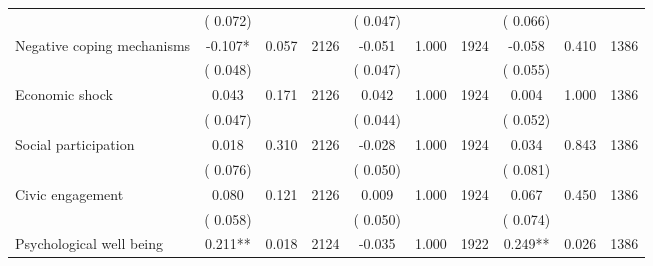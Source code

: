 \begin{tabular}{l*{9}{c}}
                               &        (       0.072) & &                                                                 &       (       0.047) & &                                                          &       (       0.066) & &  \\ 
 Negative coping mechanisms                 &             -0.107*          &        0.057 & 2126          &             -0.051 &        1.000 & 1924                   &       -0.058 &        0.410 & 1386                 \\ 
                               &        (       0.048) & &                                                                 &       (       0.047) & &                                                          &       (       0.055) & &  \\ 
 Economic shock                 &              0.043          &        0.171 & 2126          &              0.042 &        1.000 & 1924                   &        0.004 &        1.000 & 1386                 \\ 
                               &        (       0.047) & &                                                                 &       (       0.044) & &                                                          &       (       0.052) & &   \\ 
 Social participation                 &              0.018          &        0.310 & 2126          &             -0.028 &        1.000 & 1924                   &        0.034 &        0.843 & 1386                 \\ 
                               &        (       0.076) & &                                                                 &       (       0.050) & &                                                          &       (       0.081) & &   \\ 
 Civic engagement                 &              0.080          &        0.121 & 2126          &              0.009 &        1.000 & 1924                   &        0.067 &        0.450 & 1386                 \\ 
                               &        (       0.058) & &                                                                 &       (       0.050) & &                                                          &       (       0.074) & &  \\ 
 Psychological well being                &              0.211**        &        0.018 & 2124        &             -0.035 &        1.000 & 1922               &        0.249** &        0.026 & 1386       \\ 

\end{tabular}

